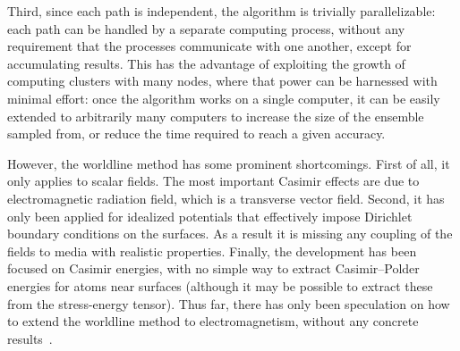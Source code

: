 Third, since each path is independent, the algorithm is trivially parallelizable: each path
can be handled by a separate computing process, without any requirement that the processes communicate
with one another, except for accumulating results.  This has the advantage of exploiting the growth of computing clusters with many nodes,
where that power can be harnessed with minimal effort: once the algorithm works on a single computer,
it can be easily extended to arbitrarily many computers to increase the size of the ensemble sampled
from, or reduce the time required to reach a given accuracy.  




However, the worldline method has some prominent shortcomings.  First of all, it only applies 
to scalar fields.
  The most important Casimir effects are due to electromagnetic radiation field, 
which is a transverse vector field.
  Second, it has only been applied for idealized potentials that effectively impose 
Dirichlet boundary conditions on the surfaces.  As a result it is missing any 
coupling of the fields to media with realistic properties.
Finally, the development has been focused on Casimir energies, with no simple way to 
extract Casimir--Polder energies for atoms near surfaces 
(although it may be possible to extract these from the stress-energy tensor). 
Thus far, there has only been speculation on how to extend the worldline method to 
electromagnetism, without any concrete results~\cite{Aehlig2011}.  


